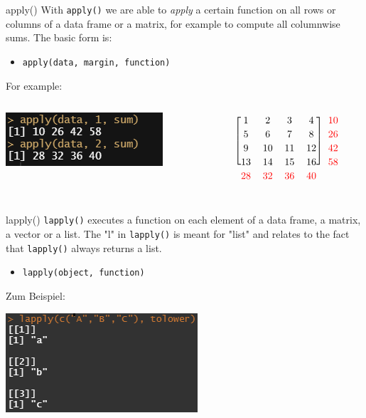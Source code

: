\documentclass[xcolor=dvipsnames, aspectratio = 169]{beamer}
\begin{document}
\begin{frame}[fragile]{apply()}
	With \verb+apply()+ we are able to \textit{apply} a certain function on all rows or columns of a data frame or a matrix, for example to compute all columnwise sums. The basic form is:
	\begin{itemize}
		\item \verb+apply(data, margin, function)+
	\end{itemize}
	For example:
	\begin{columns}[T]
		\begin{column}{0.5\textwidth}
			\includegraphics{Apply}
		\end{column}
		\begin{column}{0.4\textwidth}
			\[
			\renewcommand\BAextrarowheight{2pt}
			\begin{blockarray}{*{5}{c}}
				\begin{block}{[*{4}{c}]{c}}
				    1 &2 &3 &4&\textcolor{red}{10}\\
				    5 &6 &7 &8&\textcolor{red}{26}\\
				    9 &10 &11 &12&\textcolor{red}{42}\\
				    13 &14 &15 &16&\textcolor{red}{58}\\
				\end{block}
				\textcolor{red}{28} & \textcolor{red}{32} & \textcolor{red}{36} & \textcolor{red}{40}
			\end{blockarray}
			\]
		\end{column}
	\end{columns}
	
\end{frame}

\begin{frame}[fragile]{lapply()}
	\verb+lapply()+ executes a function on each element of a data frame, a matrix, a vector or a list. The "l" in \verb+lapply()+ is meant for "list" and relates to the fact that \verb+lapply()+ always returns a list.
	\begin{itemize}
		\item \verb+lapply(object, function)+
	\end{itemize}
	Zum Beispiel:\\
	\begin{center}
		\includegraphics{lapply}
	\end{center}
	
	
\end{frame}
\end{document}

